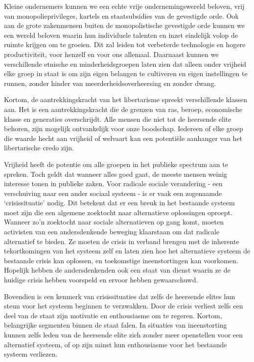 \documentclass[
  a5paper,
  smalldemyvopaper,10pt,twoside,onecolumn,openright,extrafontsizes,hidelinks]{memoir}
\begin{document}
Kleine ondernemers kunnen we een echte vrije ondernemingswereld beloven,
vrij van monopolieprivileges, kartels en staatsubsidies van de
gevestigde orde. Ook aan de grote zakenmensen buiten de monopolistische
gevestigde orde kunnen we een wereld beloven waarin hun individuele
talenten en inzet eindelijk volop de ruimte krijgen om te groeien. Dit
zal leiden tot verbeterde technologie en hogere productiviteit, voor
henzelf en voor ons allemaal. Daarnaast kunnen we verschillende etnische
en minderheidsgroepen laten zien dat alleen onder vrijheid elke groep in
staat is om zijn eigen belangen te cultiveren en eigen instellingen te
runnen, zonder hinder van meerderheidsoverheersing en zonder dwang.

Kortom, de aantrekkingskracht van het libertarisme spreekt verschillende
klassen aan. Het is een aantrekkingskracht die de grenzen van ras,
beroep, economische klasse en generaties overschrijdt. Alle mensen die
niet tot de heersende elite behoren, zijn mogelijk ontvankelijk voor
onze boodschap. Iedereen of elke groep die waarde hecht aan vrijheid of
welvaart kan een potentiële aanhanger van het libertarische credo zijn.

Vrijheid heeft de potentie om alle groepen in het publieke spectrum aan
te spreken. Toch geldt dat wanneer alles goed gaat, de meeste mensen
weinig interesse tonen in publieke zaken. Voor radicale sociale
verandering - een verschuiving naar een ander sociaal systeem - is er
vaak een zogenaamde `crisissituatie' nodig. Dit betekent dat er een
breuk in het bestaande systeem moet zijn die een algemene zoektocht naar
alternatieve oplossingen oproept. Wanneer zo'n zoektocht naar sociale
alternatieven op gang komt, moeten activisten van een andersdenkende
beweging klaarstaan om dat radicale alternatief te bieden. Ze moeten de
crisis in verband brengen met de inherente tekortkomingen van het
systeem zelf en laten zien hoe het alternatieve systeem de bestaande
crisis kan oplossen, en toekomstige ineenstortingen kan voorkomen.
Hopelijk hebben de andersdenkenden ook een staat van dienst waarin ze de
huidige crisis hebben voorspeld en ervoor hebben gewaarschuwd.

Bovendien is een kenmerk van crisissituaties dat zelfs de heersende
elites hun steun voor het systeem beginnen te verzwakken. Door de crisis
verliest zelfs een deel van de staat zijn motivatie en enthousiasme om
te regeren. Kortom, belangrijke segmenten binnen de staat falen. In
situaties van ineenstorting kunnen zelfs leden van de heersende elite
zich zonder meer openstellen voor een alternatief systeem, of op zijn
minst hun enthousiasme voor het bestaande systeem verliezen.
\end{document}
